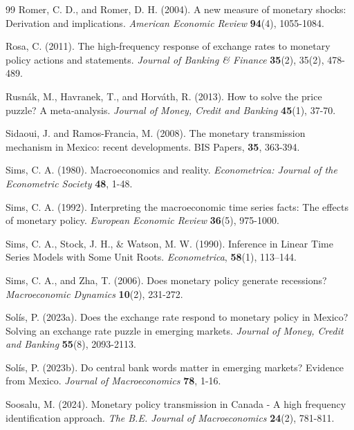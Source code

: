 \documentclass[12pt, reqno]{article}
\begin{document}
\begin{thebibliography}{99}
\bibitem{} \hypertarget{Romer and Romer (2004)}{}Romer, C. D., and Romer, D. H. (2004). A new measure of monetary shocks: Derivation and implications. \textit{American Economic Review} \textbf{94}(4), 1055-1084.

\bibitem{} \hypertarget{Rosa (2011)}{}Rosa, C. (2011). The high-frequency response of exchange rates to monetary policy actions and statements. \textit{Journal of Banking \& Finance} \textbf{35}(2), 35(2), 478-489.

\bibitem{} \hypertarget{Rusnak et al. (2013)}{} Rusnák, M., Havranek, T., and Horváth, R. (2013). How to solve the price puzzle? A meta‐analysis. \textit{Journal of Money, Credit and Banking} \textbf{45}(1), 37-70.

\bibitem{}  \hypertarget{Sidaoui and Ramos-Francia (2008)}{}Sidaoui, J. and Ramos-Francia, M. (2008). The monetary transmission mechanism in Mexico: recent developments. BIS Papers, \textbf{35}, 363-394.

\bibitem{} \hypertarget{Sims (1980)}{}Sims, C. A. (1980). Macroeconomics and reality. \textit{Econometrica: Journal of the Econometric Society} \textbf{48}, 1-48.

\bibitem{} \hypertarget{Sims (1992)}{}Sims, C. A. (1992). Interpreting the macroeconomic time series facts: The effects of monetary policy. \textit{European Economic Review} \textbf{36}(5), 975-1000.

\bibitem{} \hypertarget{Sims et al. (1990)}{}Sims, C. A., Stock, J. H., \& Watson, M. W. (1990). Inference in Linear Time Series Models with Some Unit Roots. \textit{Econometrica}, \textbf{58}(1), 113–144.

\bibitem{} \hypertarget{Sims and Zha (2006)}{}Sims, C. A., and Zha, T. (2006). Does monetary policy generate recessions? \textit{Macroeconomic Dynamics} \textbf{10}(2), 231-272.

\bibitem{} \hypertarget{Solis (2023a)}{}Solís, P. (2023a). Does the exchange rate respond to monetary policy in Mexico? Solving an exchange rate puzzle in emerging markets. \textit{Journal of Money, Credit and Banking} \textbf{55}(8), 2093-2113.

\bibitem{} \hypertarget{Solis (2023b)}{}Solís, P. (2023b). Do central bank words matter in emerging markets? Evidence from Mexico. \textit{Journal of Macroeconomics} \textbf{78}, 1-16.

\bibitem{} \hypertarget{Soosalu (2024)}{} 
Soosalu, M. (2024). Monetary policy transmission in Canada - A high frequency identification approach. \textit{The B.E. Journal of Macroeconomics} \textbf{24}(2), 781-811.


\end{thebibliography}
\end{document}
